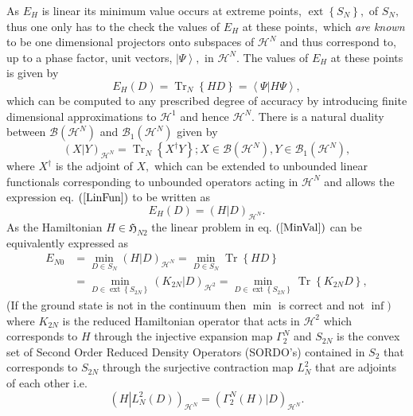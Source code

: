 \documentclass[aps,preprint]{revtex4}%
\begin{document}
As $E_{H}$ is linear its minimum value occurs at extreme points,
$\operatorname*{ext}\left\{  S_{N}\right\}  ,$ of $S_{N},$ thus one only has
to the check the values of $E_{H}$ at these points$,$ which \emph{are known}
to be one dimensional projectors onto subspaces of $\mathcal{H}^{N}$ and thus
correspond to, up to a phase factor, unit vectors, $\left\vert \Psi
\right\rangle ,$ in $\mathcal{H}^{N}.$ The values of $E_{H}$ at these points
is given by
\begin{equation}
E_{H}\left(  D\right)  =\operatorname*{Tr}\nolimits_{N}\left\{  HD\right\}
=\left\langle \left.  \Psi\right\vert H\Psi\right\rangle , \label{Enval}%
\end{equation}
which can be computed to any prescribed degree of accuracy by introducing
finite dimensional approximations to $\mathcal{H}^{1}$ and hence
$\mathcal{H}^{N}$. There is a natural duality between $\mathcal{B}\left(
\mathcal{H}^{N}\right)  $ and $\mathcal{B}_{1}\left(  \mathcal{H}^{N}\right)
$ given by
\begin{equation}
\left(  X\left\vert Y\right.  \right)  _{\mathcal{H}^{N}}=\operatorname*{Tr}%
\nolimits_{N}\left\{  X^{\dagger}Y\right\}  ;X\in\mathcal{B}\left(
\mathcal{H}^{N}\right)  ,Y\in\mathcal{B}_{1}\left(  \mathcal{H}^{N}\right)  ,
\end{equation}
where $X^{\dagger}$ is the adjoint of $X,$ which can be extended to unbounded
linear functionals corresponding to unbounded operators acting in
$\mathcal{H}^{N}$ and allows the expression eq. $\left(  \ref{LinFun}\right)
$ to be written as
\begin{equation}
E_{H}\left(  D\right)  =\left(  H\left\vert D\right.  \right)  _{\mathcal{H}%
^{N}}.
\end{equation}
As the Hamiltonian $H\in\mathfrak{H}_{N2}$ the linear problem in eq. $\left(
\ref{MinVal}\right)  $ can be equivalently expressed as
\begin{align}
E_{N0}  &  =\min_{D\in S_{N}}\left(  H\left\vert D\right.  \right)
_{\mathcal{H}^{N}}=\min_{D\in S_{N}}\operatorname*{Tr}\left\{  HD\right\}
\label{MinVal2}\\
&  =\min_{D\in\operatorname*{ext}\left\{  S_{2N}\right\}  }\left(
K_{2N}\left\vert D\right.  \right)  _{\mathcal{H}^{2}}=\min_{D\in
\operatorname*{ext}\left\{  S_{2N}\right\}  }\operatorname*{Tr}\left\{
K_{2N}D\right\}  ,
\end{align}
(If the ground state is not in the continuum then $\min$ is correct and not
$\inf)$ where $K_{2N}$ is the reduced Hamiltonian operator that acts in
$\mathcal{H}^{2}$ which corresponds to $H$ through the injective expansion map
$\Gamma_{2}^{N}$ and $S_{2N}$ is the convex set of Second Order Reduced
Density Operators (SORDO's) contained in $S_{2}$ that corresponds to $S_{2N}$
through the surjective contraction map $L_{N}^{2}$ that are adjoints of each
other i.e.
\begin{equation}
\left(  H\left\vert L_{N}^{2}\left(  D\right)  \right.  \right)
_{\mathcal{H}^{N}}=\left(  \Gamma_{2}^{N}\left(  H\right)  \left\vert
D\right.  \right)  _{\mathcal{H}^{N}}.
\end{equation}
\end{document}

